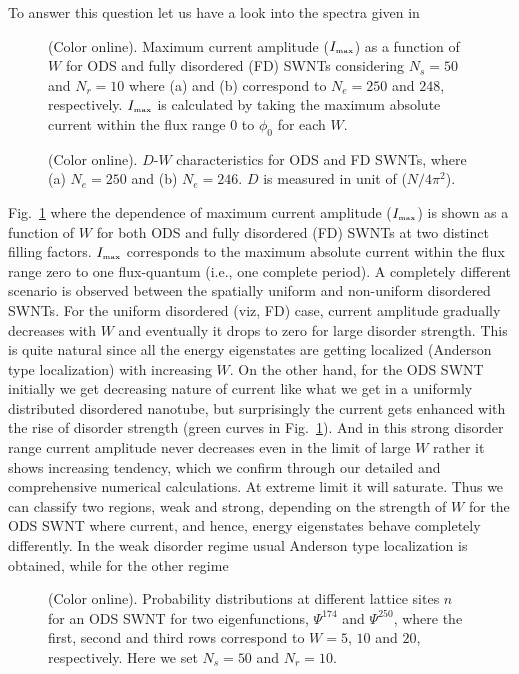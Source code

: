 \documentclass[prb,aps,twocolumn,amsmath,amssymb,floatfix,
superscriptaddress]{revtex4}
\begin{document}
To answer this question let us have a look into the spectra given in 
\begin{figure}[ht]
{\centering {}\par}
\caption{(Color online). Maximum current amplitude ($I_{\mbox{\tiny max}}$) 
as a function of $W$ for ODS and fully disordered (FD) SWNTs considering
$N_s=50$ and $N_r=10$ where (a) and (b) correspond to $N_e=250$ and $248$, 
respectively. $I_{\mbox{\tiny max}}$ is calculated by taking the maximum 
absolute current within the flux range $0$ to $\phi_0$ for each $W$.}
\label{fig5}
\end{figure}
\begin{figure}[ht]
{\centering {}\par}
\caption{(Color online). $D$-$W$ characteristics for ODS and FD SWNTs, where 
(a) $N_e = 250$ and (b) $N_e = 246$. $D$ is measured in unit of ($N/4\pi^2$).}
\label{fig6}
\end{figure}
Fig.~\ref{fig5} where the dependence of maximum current amplitude
($I_{\mbox{\tiny max}}$) is shown as a function of $W$ for both ODS and fully 
disordered (FD) SWNTs at two distinct filling factors. $I_{\mbox{\tiny max}}$
corresponds to the maximum absolute current within the flux range zero to one
flux-quantum (i.e., one complete period). A completely different scenario is
observed between the spatially uniform and non-uniform disordered SWNTs. For
the uniform disordered (viz, FD) case, current amplitude gradually decreases
with $W$ and eventually it drops to zero for large disorder strength. This is
quite natural since all the energy eigenstates are getting localized (Anderson
type localization) with increasing $W$. On the other hand, for the ODS SWNT 
initially we get decreasing nature of current
like what we get in a uniformly distributed disordered nanotube, but surprisingly
the current gets enhanced with the rise of disorder strength (green curves in
Fig.~\ref{fig5}). And in this strong disorder range current amplitude never 
decreases even in the limit of large $W$ rather it shows increasing tendency, 
which we confirm through our detailed and comprehensive numerical calculations. 
At extreme limit it will saturate. Thus we can classify two regions, weak and 
strong, depending on the strength of $W$ for the ODS SWNT where current, and 
hence, energy eigenstates behave completely differently. In the weak disorder
regime usual Anderson type localization is obtained, while for the other regime
\begin{figure}[ht]
{\centering {}\par}
\caption{(Color online). Probability distributions at different lattice sites
$n$ for an ODS SWNT for two eigenfunctions, $\Psi^{174}$ and $\Psi^{250}$, 
where the first, second and third rows correspond to $W=5$, $10$ and $20$, 
respectively. Here we set $N_s=50$ and $N_r=10$.}
\label{fig7}
\end{figure}
\end{document}
